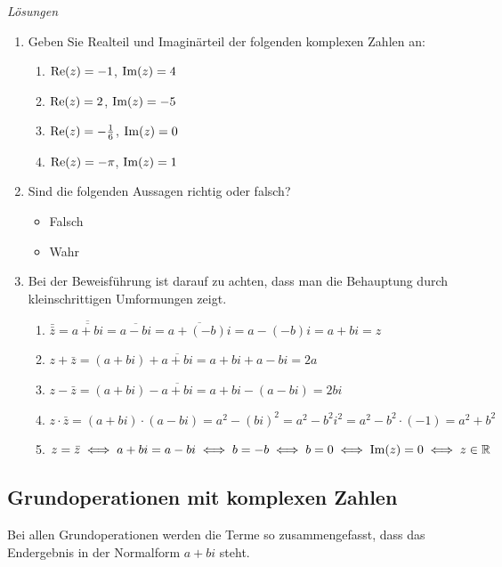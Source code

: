 \clearpage
\emph{Lösungen}
\begin{enumerate}
    \item Geben Sie Realteil und Imaginärteil der folgenden komplexen Zahlen an:
    \begin{enumerate}
        \item $\mathrm{Re}(z)=-1$, $\mathrm{Im}(z)=4$
        \item $\mathrm{Re}(z)=2$, $\mathrm{Im}(z)=-5$
        \item $\mathrm{Re}(z)=-\frac{1}{6}$, $\mathrm{Im}(z)=0$
        \item $\mathrm{Re}(z)=-\pi$, $\mathrm{Im}(z)=1$
    \end{enumerate}
    
    \item Sind die folgenden Aussagen richtig oder falsch?
    \begin{itemize}
        \item Falsch
        \item Wahr
    \end{itemize}
    
    \item 
    Bei der Beweisführung ist darauf zu achten, dass man die Behauptung durch kleinschrittigen Umformungen zeigt. 
    \begin{enumerate}
        \item $\bar{\bar z} = \overline{\overline{a+bi}} = \overline{a-bi} = \overline{a+(-b)i} = a-(-b)i = a+bi = z$ 
        \item $z + \bar{z} = (a+bi) + \overline{a+bi} = a+bi + a-bi = 2a$
        \item $z - \bar{z} = (a+bi) - \overline{a+bi} = a+bi -(a-bi) = 2bi$
        \item $z \cdot \bar{z} = (a+bi)\cdot(a-bi) = a^2 - (bi)^2 = a^2 -b^2i^2 = a^2-b^2\cdot (-1) = a^2+b^2$
        \item $z = \bar{z} \iff a+bi = a-bi \iff b = -b \iff b=0 \iff \mathrm{Im}(z)=0 \iff  z \in \mathbb{R}$
    \end{enumerate}
\end{enumerate}















\clearpage
\subsection{Grundoperationen mit komplexen Zahlen}
Bei allen Grundoperationen werden die Terme so zusammengefasst, dass das Endergebnis in der Normalform $a+bi$ steht. 

